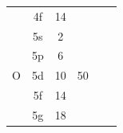 \documentclass[
	a4paper,
	parskip=half,
    pagesize=auto,      		%
    listof=totoc,   		%
    bibliography=totoc,
	11pt
]{scrartcl}
\begin{document}
\begin{table}[htp]
\begin{tabular}{cccccc}
		& 4f & 14 &                     & \multicolumn{1}{l}{} & \multicolumn{1}{l}{} \\
		\multirow{5}{*}{O} & 5s & 2  & \multirow{5}{*}{50} & \multicolumn{1}{l}{} & \multicolumn{1}{l}{} \\ \addlinespace
		& 5p & 6  &                     & \multicolumn{1}{l}{} & \multicolumn{1}{l}{} \\
		& 5d & 10 &                     & \multicolumn{1}{l}{} & \multicolumn{1}{l}{} \\
		& 5f & 14 &                     & \multicolumn{1}{l}{} & \multicolumn{1}{l}{} \\
		& 5g & 18 &                     & \multicolumn{1}{l}{} & \multicolumn{1}{l}{} \\ \bottomrule 
	\end{tabular}
\end{table}











    \cleardoublepage
    
    

\end{document}
